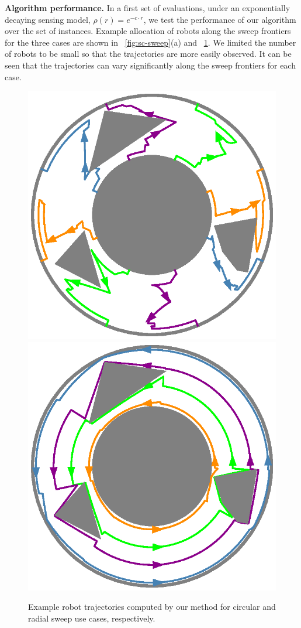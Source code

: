 \textbf{Algorithm performance.} In a first set of evaluations, under an exponentially 
decaying sensing 
model, $\rho(r) = e^{-c\cdot r}$, we test the performance of our algorithm over 
the set of instances. Example allocation of robots along the sweep frontiers for 
the three cases are shown in ~\ref{fig:sc-sweep}(a) and ~\ref{fig:sc-simulations}. 
We limited the number of robots to be small so that the trajectories are more easily 
observed. It can be seen that the trajectories can vary significantly along the 
sweep frontiers for each case. 
\begin{figure}[ht]
    \centering
    \includegraphics[width=.45\linewidth]{chapters/sc/fig/circular_sol.eps}\hspace{2mm}
    \includegraphics[width=.45\linewidth]{chapters/sc/fig/rotational_sol.eps}
    
    \caption{Example robot trajectories computed by our method for circular and radial 
    sweep use cases, respectively.
    }
    \label{fig:sc-simulations}
\end{figure}


